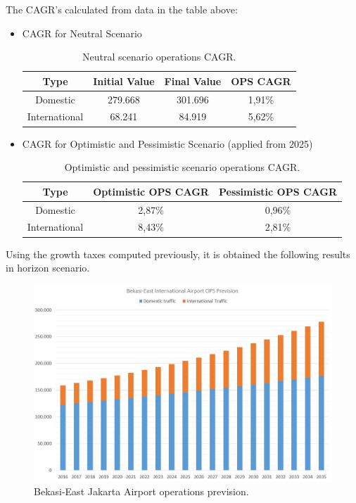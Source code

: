 The CAGR's calculated from  data in the table above:
	\begin{itemize}
		\item CAGR for Neutral Scenario
		
\begin{table}[ht!]
	\label{table:CAGRNeutralOPS}
	\centering
\begin{tabular}{|c|c|c|c|}
	\hline 
	\textbf{Type} & \textbf{Initial Value} & \textbf{Final Value} & \textbf{OPS CAGR}\tabularnewline
	\hline 
	Domestic & 279.668  & 301.696  & 1,91\% \tabularnewline
	\hline 
	International & 68.241  & 84.919  & 5,62\% \tabularnewline
	\hline 
\end{tabular}
	\caption{Neutral scenario operations CAGR.}
\end{table}
		
		\item CAGR for Optimistic and Pessimistic Scenario (applied from 2025)
		
\begin{table}[ht!]
			\label{table:CAGROPTPESOPS}
			\centering
	\begin{tabular}{|c|c|c|}
		\hline 
		\textbf{Type} & \textbf{Optimistic OPS CAGR} & \textbf{Pessimistic OPS CAGR}\tabularnewline
		\hline  
		Domestic & 2,87\%  & 0,96\% \tabularnewline
		\hline 
		International & 8,43\%  & 2,81\% \tabularnewline
		\hline 
\end{tabular}
			\caption{Optimistic and pessimistic scenario operations CAGR.}
		\end{table}
		
	\end{itemize}
	
Using the growth taxes computed previously, it is obtained the following results in horizon scenario.
	
\begin{figure}[H]
	\centering
	\includegraphics[clip, trim=0cm 0cm 0cm 0cm, width=1\textwidth]{./images/PROGNOSIS/TrafficForecast/BE_OPS_Prev}
	\caption{Bekasi-East Jakarta Airport operations prevision.}
	\label{BE_OPS_Prev}
\end{figure}


